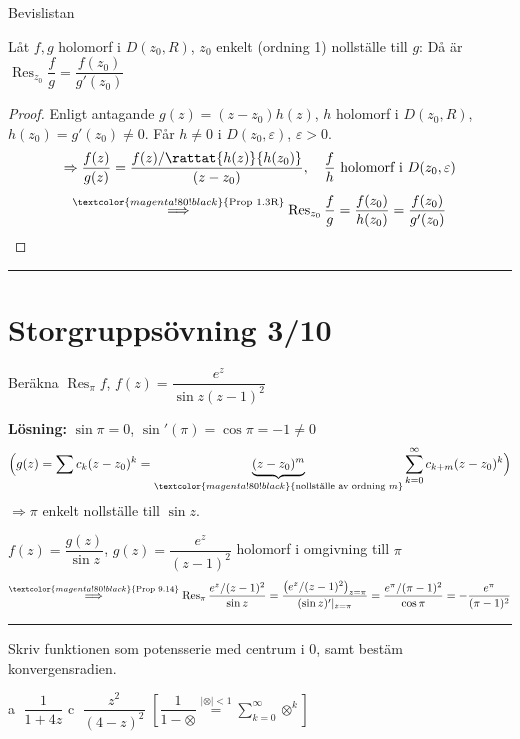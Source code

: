 \begin{theorem}[Prop 9.14]
\hfill \textcolor{magenta!80!black}{Bevislistan}

Låt $f, g$ holomorf i $D(z_0, R)$, $z_0$ enkelt \textcolor{magenta!80!black}{(ordning 1)} nollställe till $g$: Då är $\operatorname{Res}_{z_0} \dfrac{f}{g} = \dfrac{f(z_0)}{g'(z_0)}$
\end{theorem}
\begin{proof}
Enligt antagande $g(z) = (z - z_0)h(z)$, $h$ holomorf i $D(z_0, R)$, $h(z_0) = g'(z_0) \neq 0$. Får $h \neq 0$ i $D(z_0, \varepsilon)$, $\varepsilon > 0$.
\[ \Rightarrow \frac{f(z)}{g(z)} = \frac{f(z)/\rattat{h(z)}{h(z_0)}}{(z - z_0)}, \quad \frac{f}{h} \text{ holomorf i } D(z_0, \varepsilon) \]
\[ \overset{\textcolor{magenta!80!black}{\text{Prop 1.3R}}}{\Longrightarrow} \operatorname{Res}_{z_0} \frac{f}{g} = \frac{f(z_0)}{h(z_0)} = \frac{f(z_0)}{g'(z_0)} \]
\end{proof}

\noindent\rule{\linewidth}{0.4pt}

\section{Storgruppsövning 3/10}

\begin{example}
Beräkna $\operatorname{Res}_\pi f$, $f(z) = \dfrac{e^z}{\sin z(z - 1)^2}$

\textbf{Lösning:} $\sin \pi = 0$, $\sin'(\pi) = \cos \pi = -1 \neq 0$
\[ \Big( g(z) = \sum c_k(z - z_0)^k = \underbrace{(z - z_0)^m}_{\textcolor{magenta!80!black}{\text{nollställe av ordning } m}} \sum_{k = 0}^\infty c_{k+m}(z - z_0)^k \Big) \]
$\Rightarrow \pi$ enkelt nollställe till $\sin z$.

$f(z) = \dfrac{g(z)}{\sin z}$, $g(z) = \dfrac{e^z}{(z - 1)^2}$ holomorf i omgivning till $\pi$
\[ \overset{\textcolor{magenta!80!black}{\text{Prop 9.14}}}{\Longrightarrow} \operatorname{Res}_\pi \frac{e^z/(z - 1)^2}{\sin z} = \frac{\left( e^z/(z - 1)^2 \right)_{z = \pi}}{(\sin z)'|_{z = \pi}} = \frac{e^\pi/(\pi - 1)^2}{\cos \pi} = -\frac{e^\pi}{(\pi - 1)^2} \]
\end{example}

\noindent\rule{\linewidth}{0.4pt}

 \quad Skriv funktionen som potensserie med centrum i $0$, samt bestäm konvergensradien.

\textcircled{a} $\dfrac{1}{1 + 4z}$ \qquad \textcircled{c} $\dfrac{z^2}{(4 - z)^2}$ \qquad $\left[ \dfrac{1}{1 - \otimes} \overset{|\otimes| < 1}{=} \displaystyle\sum_{k = 0}^\infty \otimes^k \right]$

